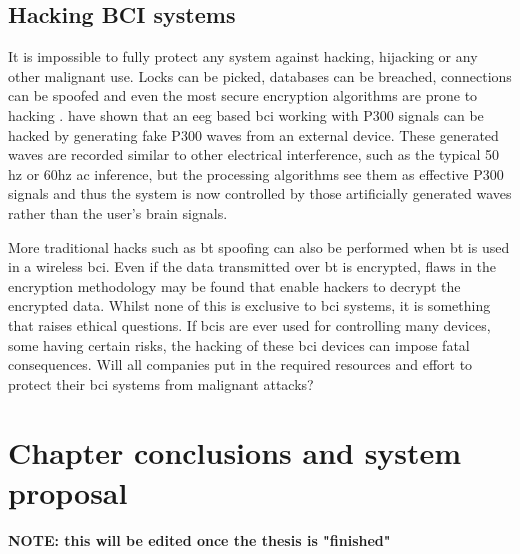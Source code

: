 
\subsection{Hacking BCI systems}
\label{subsec:bci_ethical_hacking}

It is impossible to fully protect any system against hacking, hijacking or any other malignant use.
Locks can be picked, databases can be breached,  connections can be spoofed and even the most secure encryption algorithms are prone to hacking \citep{quantum_hacking}.
 have shown that an \gls{eeg} based \gls{bci} working with P300 signals can be hacked by generating fake P300 waves from an external device.
These generated waves are recorded similar to other electrical interference, such as the typical 50 \gls{hz} or 60\gls{hz} \gls{ac} inference, but the processing algorithms see them as effective P300 signals and thus the system is now controlled by those artificially generated waves rather than the user's brain signals.

More traditional hacks such as \gls{bt} spoofing can also be performed when \gls{bt} is used in a wireless \gls{bci}.
Even if the data transmitted over \gls{bt} is encrypted, flaws in the encryption methodology may be found that enable hackers to decrypt the encrypted data.
Whilst none of this is exclusive to \gls{bci} systems, it is something that raises ethical questions.
If \glspl{bci} are ever used for controlling many devices, some having certain risks, the hacking of these \gls{bci} devices can impose fatal consequences.
Will all companies put in the required resources and effort to protect their \gls{bci} systems from malignant attacks?


\section{Chapter conclusions and system proposal}
\label{sec:bci_concolusion_and_proposing_ours}




\textbf{NOTE: this will be edited once the thesis is "finished"}

